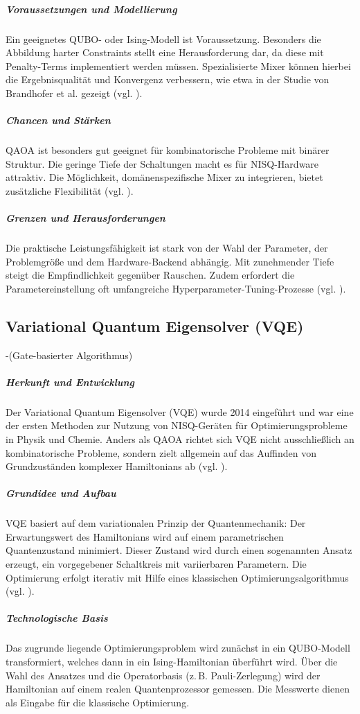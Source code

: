 \subparagraph{Voraussetzungen und Modellierung}
Ein geeignetes QUBO- oder Ising-Modell ist Voraussetzung. Besonders die Abbildung harter Constraints stellt eine Herausforderung dar, da diese mit Penalty-Terms implementiert werden müssen. Spezialisierte Mixer können hierbei die Ergebnisqualität und Konvergenz verbessern, wie etwa in der Studie von Brandhofer et al. gezeigt (vgl. \cite{brandhofer_benchmarking_2022}).

\subparagraph{Chancen und Stärken}
QAOA ist besonders gut geeignet für kombinatorische Probleme mit binärer Struktur. Die geringe Tiefe der Schaltungen macht es für NISQ-Hardware attraktiv. Die Möglichkeit, domänenspezifische Mixer zu integrieren, bietet zusätzliche Flexibilität (vgl. \cite{brandhofer_benchmarking_2022}).

\subparagraph{Grenzen und Herausforderungen}
Die praktische Leistungsfähigkeit ist stark von der Wahl der Parameter, der Problemgröße und dem Hardware-Backend abhängig. Mit zunehmender Tiefe steigt die Empfindlichkeit gegenüber Rauschen. Zudem erfordert die Parametereinstellung oft umfangreiche Hyperparameter-Tuning-Prozesse (vgl. \cite{buonaiuto_best_2023}).

\subsection{Variational Quantum Eigensolver (VQE)}-(Gate-basierter Algorithmus)

\subparagraph{Herkunft und Entwicklung}
Der Variational Quantum Eigensolver (VQE) wurde 2014 eingeführt und war eine der ersten Methoden zur Nutzung von NISQ-Geräten für Optimierungsprobleme in Physik und Chemie. Anders als QAOA richtet sich VQE nicht ausschließlich an kombinatorische Probleme, sondern zielt allgemein auf das Auffinden von Grundzuständen komplexer Hamiltonians ab (vgl. \cite{buonaiuto_best_2023}).

\subparagraph{Grundidee und Aufbau}
VQE basiert auf dem variationalen Prinzip der Quantenmechanik: Der Erwartungswert des Hamiltonians wird auf einem parametrischen Quantenzustand minimiert. Dieser Zustand wird durch einen sogenannten Ansatz erzeugt, ein vorgegebener Schaltkreis mit variierbaren Parametern. Die Optimierung erfolgt iterativ mit Hilfe eines klassischen Optimierungsalgorithmus (vgl. \cite{buonaiuto_best_2023}).

\subparagraph{Technologische Basis}
Das zugrunde liegende Optimierungsproblem wird zunächst in ein QUBO-Modell transformiert, welches dann in ein Ising-Hamiltonian überführt wird. Über die Wahl des Ansatzes und die Operatorbasis (z.\,B. Pauli-Zerlegung) wird der Hamiltonian auf einem realen Quantenprozessor gemessen. Die Messwerte dienen als Eingabe für die klassische Optimierung.

